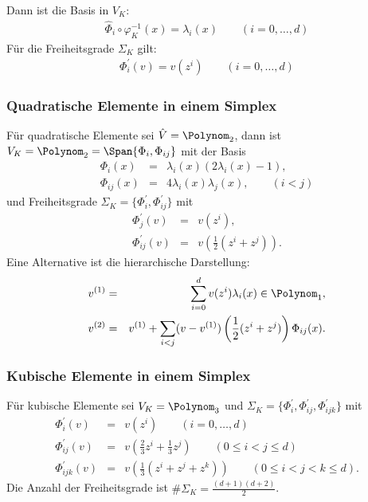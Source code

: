 Dann ist die Basis in $V_K$:
\begin{eqnarray*}
    \hat \Phi_i \circ \varphi_K^{-1} (x) = \lambda_i (x)
    \qquad (i = 0, \dots, d)
\end{eqnarray*}
Für die Freiheitsgrade $\Sigma_K$ gilt:
\begin{eqnarray*}
    \Phi_i^\prime (v) = v(z^i) \qquad (i = 0, \dots, d)
\end{eqnarray*}


\subsubsection{Quadratische Elemente in einem Simplex}


Für quadratische Elemente sei $\hat V = \Polynom_2$, dann
ist $V_K = \Polynom_2 = \Span\{\Phi_i, \Phi_{ij}\}$ mit der Basis
\begin{eqnarray*}
    \Phi_i(x) &=& \lambda_i(x) (2 \lambda_i(x) - 1), \\
    \Phi_{ij}(x) &=& 4 \lambda_i(x) \lambda_j(x), \qquad (i < j)
\end{eqnarray*}
und Freiheitsgrade $\Sigma_K = \{\Phi_i^\prime, \Phi_{ij}^\prime\}$ mit
\begin{eqnarray*}
    \Phi_j^\prime(v) &=& v(z^i), \\
    \Phi_{ij}^\prime(v) &=& v\left(\frac{1}{2}(z^i + z^j)\right).
\end{eqnarray*}
Eine Alternative ist die hierarchische Darstellung:
\begin{eqnarray*}
        v^{(1)}
    &=& \sum_{i=0}^d v(z^i) \lambda_i(x) \in \Polynom_1, \\
        v^{(2)}
    &=& v^{(1)} + \sum_{i<j} (v - v^{(1)}) \left(\frac{1}{2}(z^i + z^j)\right)
        \Phi_{ij}(x).
\end{eqnarray*}


\subsubsection{Kubische Elemente in einem Simplex}


Für kubische Elemente sei $V_K = \Polynom_3$ und
$\Sigma_K = \{\Phi_i^\prime, \Phi_{ij}^\prime, \Phi_{ijk}^\prime\}$ mit
\begin{eqnarray*}
        \Phi_i^\prime(v)
    &=& v(z^i) \qquad (i = 0, \dots, d) \\
        \Phi_{ij}^\prime(v)
    &=& v\left(\frac{2}{3} z^i + \frac{1}{3} z^j\right)
        \qquad (0 \le i < j \le d) \\
        \Phi_{ijk}^\prime(v) &=& v\left(\frac{1}{3}(z^i + z^j + z^k)\right)
        \qquad (0 \le i < j < k \le d).
\end{eqnarray*}
Die Anzahl der Freiheitsgrade ist $\#\Sigma_K = \frac{(d + 1)(d + 2)}{2}$.


